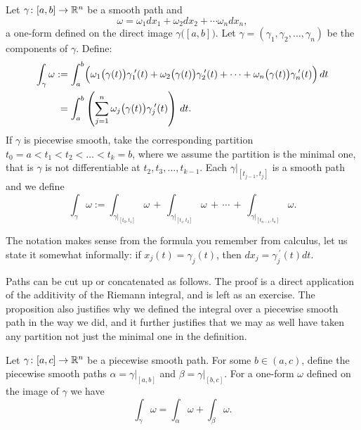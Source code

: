 \begin{defn}
Let $\gamma \colon [a,b] \to {\mathbb{R}}^n$ be a smooth path
and
\begin{equation*}
\omega = \omega_1 dx_1 + \omega_2 dx_2 + \cdots \omega_n dx_n ,
\end{equation*}
a one-form defined on the direct image $\gamma\bigl([a,b]\bigr)$.
Let $\gamma = (\gamma_1,\gamma_2,\ldots,\gamma_n)$ be the components of
$\gamma$.
Define:
\begin{equation*}
\begin{split}
\int_{\gamma} \omega
& :=
\int_a^b 
\Bigl(
\omega_1\bigl(\gamma(t)\bigr) \gamma_1^{\:\prime}(t) +
\omega_2\bigl(\gamma(t)\bigr) \gamma_2^{\:\prime}(t) + \cdots +
\omega_n\bigl(\gamma(t)\bigr) \gamma_n^{\:\prime}(t) \Bigr) \, dt
\\
&\phantom{:}=
\int_a^b 
\left(
\sum_{j=1}^n
\omega_j\bigl(\gamma(t)\bigr) \gamma_j^{\:\prime}(t) \right) \, dt .
\end{split}
\end{equation*}
If $\gamma$ is piecewise smooth, take the corresponding partition
$t_0 = a < t_1 < t_2 < \ldots < t_k = b$, where we assume the partition is
the minimal one, that is $\gamma$ is not differentiable
at $t_2,t_3,\ldots,t_{k-1}$.  Each $\gamma|_{[t_{j-1},t_j]}$ is
a smooth path and we define
\begin{equation*}
\int_{\gamma} \omega
:=
\int_{\gamma|_{[t_0,t_1]}} \omega
\,
+
\,
\int_{\gamma|_{[t_1,t_2]}} \omega
\,
+ \, \cdots \, + \,
\int_{\gamma|_{[t_{n-1},t_n]}} \omega .
\end{equation*}
\end{defn}

The notation makes sense from the formula you remember from calculus,
let us state it somewhat informally:
if $x_j(t) = \gamma_j(t)$, then $dx_j = \gamma_j^{\:\prime}(t) dt$.

Paths can be cut up or concatenated as follows.  The proof is a direct application
of the additivity of the Riemann integral, and is left as an exercise.
The proposition also justifies why we defined the integral over a piecewise
smooth path in the way we did, and it further justifies that we may as well
have taken any partition not just the minimal one in the definition.

\begin{prop} \label{mv:prop:pathconcat}
Let $\gamma \colon [a,c] \to {\mathbb{R}}^n$ be a piecewise smooth path.
For some $b \in (a,c)$,
define the piecewise smooth paths
$\alpha = \gamma|_{[a,b]}$ and
$\beta = \gamma|_{[b,c]}$.
For a one-form $\omega$ defined on the image
of $\gamma$ we have
\begin{equation*}
\int_{\gamma} \omega =
\int_{\alpha} \omega +
\int_{\beta} \omega .
\end{equation*}
\end{prop}


